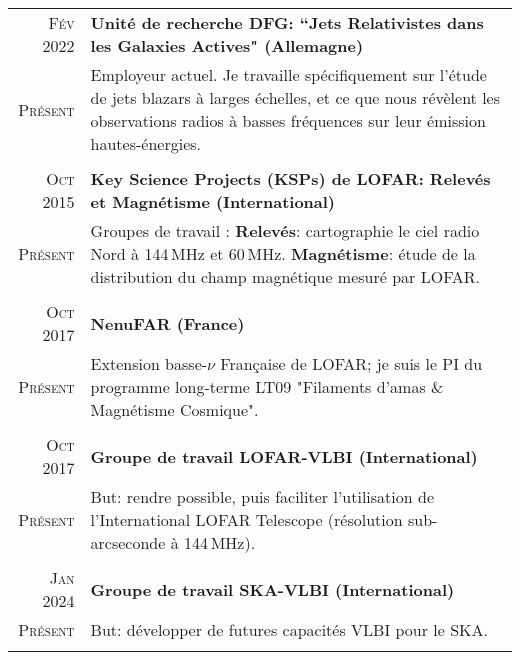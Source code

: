 \begin{tabular}{r|p{15.5cm}}
	
	\textsc{F\'ev 2022} & \textbf{Unit\'e de recherche DFG: ``Jets Relativistes dans les Galaxies Actives" (Allemagne)}\\
	\textsc{Pr\'esent}  & Employeur actuel. Je travaille sp\'ecifiquement sur l'\'etude de jets blazars \`a larges \'echelles, et ce que nous r\'ev\`elent les observations radios \`a basses fr\'equences sur leur \'emission hautes-\'energies.\\
	\multicolumn{2}{c}{} \\

	
\textsc{Oct 2015} & \textbf{Key Science Projects (KSPs) de LOFAR: Relev\'es et Magn\'etisme (International)}\\
\textsc{Pr\'esent}  &  Groupes de travail : \textbf{Relev\'es}: cartographie le ciel radio Nord \`a 144\,MHz et 60\,MHz. \textbf{Magn\'etisme}: \'etude de la distribution du champ magn\'etique mesur\'e par LOFAR.\\
\multicolumn{2}{c}{} \\

	\textsc{Oct 2017} & \textbf{NenuFAR (France)}\\
	\textsc{Pr\'esent}  & Extension basse-$\nu$ Fran\c{c}aise de LOFAR; je suis le PI du programme long-terme LT09 "Filaments d'amas \& Magn\'etisme Cosmique".\\
	\multicolumn{2}{c}{} \\
	
	\textsc{Oct 2017} & \textbf{Groupe de travail LOFAR-VLBI (International)}\\
	\textsc{Pr\'esent}  &  But: rendre possible, puis faciliter l'utilisation de l'International LOFAR Telescope (r\'esolution sub-arcseconde \`a 144\,MHz).\\
	\multicolumn{2}{c}{} \\
	
	\textsc{Jan 2024} & \textbf{Groupe de travail SKA-VLBI (International)}\\
	\textsc{Pr\'esent}  &  But: d\'evelopper de futures capacit\'es VLBI pour le SKA.\\
	\multicolumn{2}{c}{} \\
	

	
\end{tabular}



